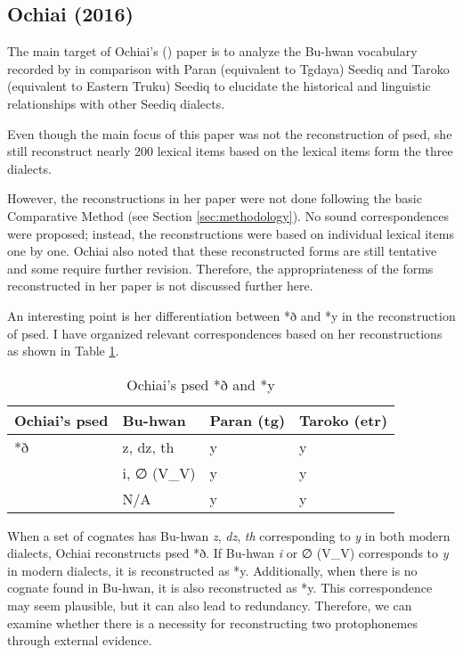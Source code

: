 \subsection{Ochiai (2016)}

The main target of Ochiai's (\citeyear{ochiai2016buhwan}) paper is to analyze the Bu-hwan vocabulary recorded by \textcite{bullock1874formosan} in comparison with Paran (equivalent to Tgdaya) Seediq and Taroko (equivalent to Eastern Truku) Seediq to elucidate the historical and linguistic relationships with other Seediq dialects.

Even though the main focus of this paper was not the reconstruction of \acl{psed}, she still reconstruct nearly 200 lexical items based on the lexical items form the three dialects.

However, the reconstructions in her paper were not done following the basic Comparative Method (see Section \ref{sec:methodology}). No sound correspondences were proposed; instead, the reconstructions were based on individual lexical items one by one. Ochiai also noted that these reconstructed forms are still tentative and some require further revision. Therefore, the appropriateness of the forms reconstructed in her paper is not discussed further here.

An interesting point is her differentiation between *ð and *y in the reconstruction of \acl{psed}. I have organized relevant correspondences based on her reconstructions as shown in Table \ref{tab:ochipsedzy}.

\begin{table}[!htbp]
\centering
\caption{Ochiai's \acl{psed} *ð and *y}
\label{tab:ochipsedzy}
\begin{tabular}{llll}
\hline
Ochiai's \acl{psed} & Bu-hwan    & Paran (\ac{tg}) & Taroko (\ac{etr}) \\ \hline
*ð                  & z, dz, th  & y               & y                 \\ \hdashline
\multirow{2}{*}{*y} & i, ∅ (V\_V) & y               & y                 \\
                    & N/A        & y               & y                 \\ \hline
\end{tabular}
\end{table}

When a set of cognates has Bu-hwan \textit{z}, \textit{dz}, \textit{th} corresponding to \textit{y} in both modern dialects, Ochiai reconstructs \acl{psed} *ð. If Bu-hwan \textit{i} or ∅ (V\_V) corresponds to \textit{y} in modern dialects, it is reconstructed as *y. Additionally, when there is no cognate found in Bu-hwan, it is also reconstructed as *y. This correspondence may seem plausible, but it can also lead to redundancy. Therefore, we can examine whether there is a necessity for reconstructing two protophonemes through external evidence. 

